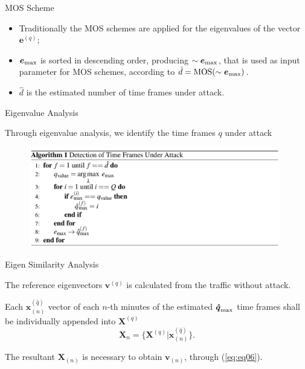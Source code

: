 \documentclass[newPxFont, numfooter, sectionpages]{beamer}
\begin{document}
\begin{frame}{MOS Scheme}

	\begin{itemize}
		\item Traditionally the MOS schemes are applied for the eigenvalues of the vector $\boldsymbol{e}^{(q)}$;
		\item $\boldsymbol{e}_{\rm max}$ is sorted in descending order, producing $\sim\boldsymbol{e}_{\rm max}$, that is used as input parameter for MOS schemes, according to $\hat{d} = \rm{MOS}(\sim\boldsymbol{e}_{\rm max})$.
		\item $\hat{d}$ is the estimated number of time frames under attack.
	\end{itemize}
	
\end{frame}
\begin{frame}{Eigenvalue Analysis}
	
	Through eigenvalue analysis, we identify the time frames $q$ under attack

	\begin{figure}[h!]
	     \centering 
	     \includegraphics[width=11cm]{alg.png}
	     \label{fig:2_fig91}
	\end{figure}

\end{frame}
\begin{frame}{Eigen Similarity Analysis}
	
	The reference eigenvectors $\boldsymbol{v}^{(q)}$ is calculated from the traffic without attack. 

	Each $\boldsymbol{x}^{(\hat{q})}_{(n)}$ vector of each $n$-th minutes of the estimated $\rm{\boldsymbol{\hat{q}}}_{\rm max}$ time frames shall be individually appended into $\boldsymbol{X}^{(q)}$
	\begin{equation}\label{eq:eq12}
		\boldsymbol{X}_{n} = \{\boldsymbol{X}^{(q)} | \boldsymbol{x}^{(\hat{q})}_{(n)}\}.
	\end{equation}

	The resultant $\boldsymbol{X}_{(n)}$ is necessary to obtain $\boldsymbol{v}_{(n)}$, through (\ref{eq:eq06}).

\end{frame}
\end{document}
